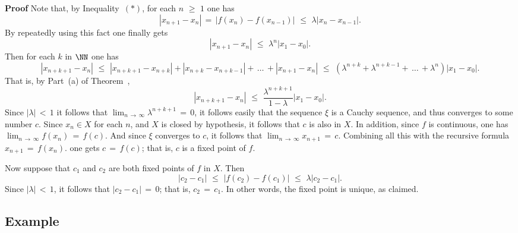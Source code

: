 \V

        {\bf Proof} Note that, by Inequality~$({\ast})$, for each $n\,\,{\geq}\,\,1$ one has
        \begin{displaymath}
        |x_{n+1}-x_{n}| \,=\, |f(x_{n})-f(x_{n-1})|\,\,{\leq}\,\,{\lambda}|x_{n}-x_{n-1}|.
        \end{displaymath}
    By repeatedly using this fact one finally gets
        \begin{displaymath}
        |x_{n+1}-x_{n}|\,\,{\leq}\,\,{\lambda}^{n}|x_{1}-x_{0}|.
        \end{displaymath}
    Then for each $k$ in ${\NN}$ one has
        \begin{displaymath}
        |x_{n+k+1} - x_{n}|\,\,{\leq}\,\,|x_{n+k+1} - x_{n+k}| + |x_{n+k} - x_{n+k-1}| + \,{\ldots}\,+ |x_{n+1} - x_{n}|\,\,{\leq}\,\,
    \left({\lambda}^{n+k} + {\lambda}^{n+k-1} + \,{\ldots}\, + {\lambda}^{n}\right)|x_{1}-x_{0}|.
        \end{displaymath}
    That is, by Part~(a) of Theorem~,
        \begin{displaymath}
        |x_{n+k+1} - x_{n}|\,\,{\leq}\,\,\frac{{\lambda}^{n+k+1}}{1-{\lambda}}|x_{1}-x_{0}|.
        \end{displaymath}
    Since $|{\lambda}|\,<\,1$ it follows that $\lim_{n \,{\rightarrow}\, {\infty}} {\lambda}^{n+k+1} \,=\, 0$,
    it follows easily that the sequence ${\xi}$ is a Cauchy sequence, and thus converges to some number $c$.
    Since $x_{n}{\in}X$ for each $n$, and $X$ is closed by hypothesis, it follows that $c$ is also in $X$.
    In addition, since $f$ is continuous, one has $\lim_{n \,{\rightarrow}\, {\infty}} f(x_{n}) \,=\, f(c)$.
    And since ${\xi}$ converges to $c$, it follows that $\lim_{n \,{\rightarrow}\, {\infty}} x_{n+1} \,=\, c$.
    Combining all this with the recursive formula $x_{n+1} \,=\, f(x_{n})$. one gets $c \,=\, f(c)$; that is, $c$ is a fixed point of $f$.

        Now suppose that $c_{1}$ and $c_{2}$ are both fixed points of $f$ in $X$.
   Then
        \begin{displaymath}
        |c_{2}-c_{1}|\,\,{\leq}\,\,|f(c_{2})-f(c_{1})|\,\,{\leq}\,\,{\lambda}|c_{2}-c_{1}|.
        \end{displaymath}
    Since $|{\lambda}|\,<\,1$, it follows that $|c_{2}-c_{1}| \,=\, 0$; that is, $c_{2} \,=\, c_{1}$.
    In other words, the fixed point is unique, as claimed.

\V


             \subsection{\small{\bf Example}}
            \label{ExampF35.70}

